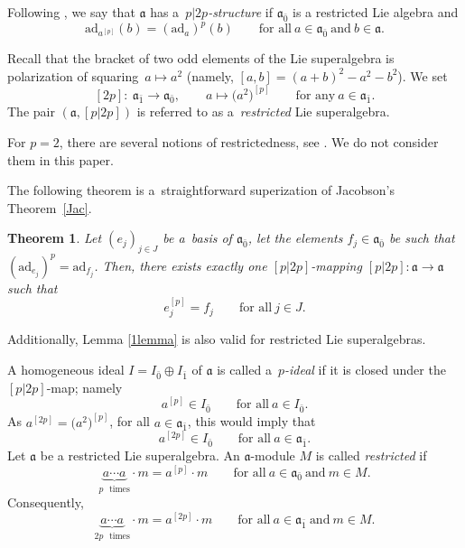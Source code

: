 \documentclass[10pt,a4paper]{amsart}
\numberwithin{equation}{section}
\newtheorem{Theorem}{Theorem}[section]
\begin{document}
Following \cite{P}, we say that $\mathfrak{a}$ has a~\textit{$p|2p$-structure} if $\mathfrak{a}_{\bar 0}$ is a restricted Lie algebra and
\[%
\mathrm{ad}_{a^{[p]}}(b)=(\mathrm{ad}_a)^p(b)\qquad \text{for all}\ a \in \mathfrak{a}_{\bar 0}\ \text{and}\ b\in \mathfrak{a}.
\]

Recall that the bracket of two odd elements of the Lie superalgebra is polarization of squaring~$a\mapsto a^2$ \big(namely, $[a,b]=(a+b)^2-a^2-b^2$\big). We set{\samepage
\[
[2p]\colon\ \mathfrak{a}_{\bar 1} \rightarrow \mathfrak{a}_{\bar 0}, \qquad a\mapsto \bigl(a^2\bigr)^{[p]}\qquad \text{for any} \ a\in \mathfrak{a}_{\bar 1}.
\]
The pair $(\mathfrak{a}, [p|2p])$ is referred to as a~\textit{restricted} Lie superalgebra.}

For $p=2$, there are several notions of restrictedness, see \cite{BLLS}. We do not consider them in this paper.

The following theorem is a~straightforward superization of Jacobson's Theorem~\ref{Jac}.
\begin{Theorem}%
Let $(e_j)_{j\in J}$ be a~basis of $\mathfrak{a}_{\bar 0}$, let the elements $f_j\in \mathfrak{a}_{\bar 0}$ be such that ${(\mathrm{ad}_{e_j})^p=\mathrm{ad}_{f_j}}$. Then, there exists exactly one $[p|2p]$-mapping $[p|2p]\colon\mathfrak{a}\rightarrow \mathfrak{a}$ such that
\[
e_j^{[p]}=f_j \qquad \text{for all} \ j\in J.
\]
\end{Theorem}
Additionally, Lemma \ref{1lemma} is also valid for restricted Lie superalgebras.

A homogeneous ideal $I=I_{\bar 0}\oplus I_{\bar 1}$ of $\mathfrak{a}$ is called a~\textit{$p$-ideal} if it is closed under the $[p|2p]$-map; namely
\[
a^{[p]}\in I_{\bar 0}\qquad \text{for all}\ a\in I_{\bar 0}.
\]
As $a^{[2p]}=\big(a^2\big)^{[p]}$, for all $a\in \mathfrak{a}_{\bar 1}$, this would imply that
\[
a^{[2p]}\in I_{\bar 0}\qquad \text{for all}\ a\in \mathfrak{a}_{\bar 1}.
\]
Let $\mathfrak{a}$ be a restricted Lie superalgebra. An $\mathfrak{a}$-module $M$ is called \textit{restricted} if
\[
\underbrace{a\cdots a}_{p\text{~~times}} \cdot m =a^{[p]}\cdot m \qquad \text{for all}\ a\in \mathfrak{a}_{\bar 0} \ \text{and}\ m\in M.
\]
Consequently,
\[
\underbrace{a\cdots a}_{2p\text{~~times}} \cdot m =a^{[2p]}\cdot m \qquad \text{for all}\ a\in \mathfrak{a}_{\bar 1} \ \text{and}\ m\in M.
\]
\end{document}
